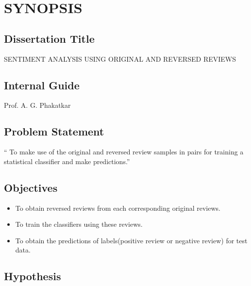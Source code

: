 \documentclass[oneside,a4paper,12pt]{pictreport}
\begin{document}
\setlength{\parindent}{11mm}
\chapter{SYNOPSIS}


\section{Dissertation Title}
SENTIMENT ANALYSIS USING ORIGINAL AND REVERSED REVIEWS



\section{Internal Guide}
Prof. A. G. Phakatkar



\section{Problem Statement}
\label{sec:problem_def}
`` To make use of the original and reversed review samples in pairs for training a
statistical classifier and make predictions.''

\section{Objectives}
\begin{itemize}
    \item To obtain reversed reviews from each corresponding original reviews.
    \item To train the classifiers  using these reviews.
    \item To obtain the predictions of labels(positive review or negative review) for test data.
\end{itemize}

\section{Hypothesis}
\end{document}
